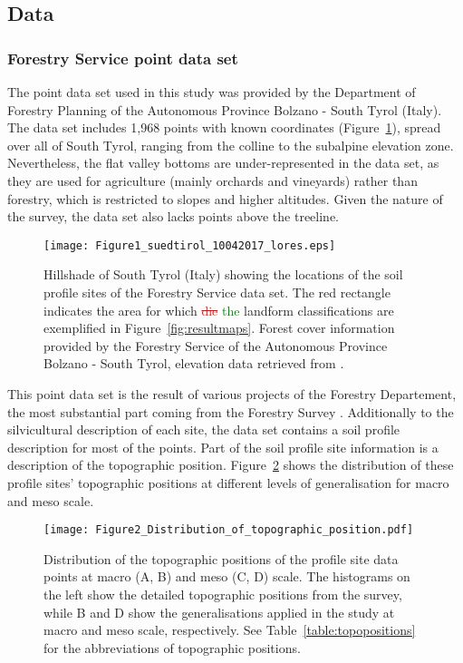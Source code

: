 \documentclass[preprint,12pt,authoryear]{elsarticle}
\begin{document}
\subsection{Data}
\subsubsection{Forestry Service point data set}
The point data set used in this study was provided by the Department of Forestry Planning of the Autonomous Province Bolzano - South Tyrol (Italy).
The data set includes 1,968 points with known coordinates (Figure~\ref{fig:datapoints}), spread over all of South Tyrol, ranging from the colline to the subalpine elevation zone. Nevertheless, the flat valley bottoms are under-represented in the data set, as they are used for agriculture (mainly orchards and vineyards) rather than forestry, which is restricted to slopes and higher altitudes. Given the nature of the survey, the data set also lacks points above the treeline.
\begin{figure}
\texttt{[image: Figure1\_suedtirol\_10042017\_lores.eps]}
\caption{Hillshade of South Tyrol (Italy) showing the locations of the soil profile sites of the Forestry Service data set. The red rectangle indicates the area for which \textcolor{red}{\sout{die}} \textcolor{green}{the} landform classifications are exemplified in Figure~\ref{fig:resultmaps}. Forest cover information provided by the Forestry Service of the Autonomous Province Bolzano - South Tyrol, elevation data retrieved from \cite{DTM}.}
\label{fig:datapoints}
\end{figure}
 This point data set is the result of  various projects of the Forestry Departement, the most substantial part coming from the Forestry Survey \citep{APB2006}. Additionally to the silvicultural description of each site, the data set contains a soil profile description for most of the points. Part of the soil profile site information is a description of the topographic position. Figure~\ref{fig:hist} shows the distribution of these profile sites' topographic positions at different levels of generalisation for macro and meso scale.

\begin{figure}
\texttt{[image: Figure2\_Distribution\_of\_topographic\_position.pdf]}
\caption{Distribution of the topographic positions of the profile site data points at macro (A, B) and meso (C, D) scale. The histograms on the left show the detailed topographic positions from the survey, while B and D show the generalisations applied in the study at macro and meso scale, respectively. See Table~\ref{table:topopositions} for the abbreviations of topographic positions.}
\label{fig:hist}
\end{figure}
\end{document}
